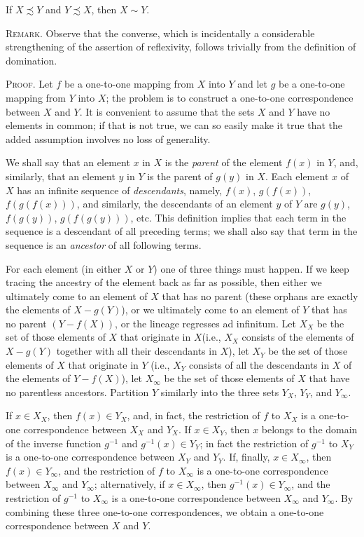 \begin{named} If $X \precsim Y$ and $Y \precsim X$, then $X \sim Y$.
\end{named}

\textsc{Remark}. Observe that the converse, which is incidentally a considerable strengthening of the assertion of reflexivity, follows trivially from the definition of domination. 

\textsc{Proof}. Let $f$ be a one-to-one mapping from $X$ into $Y$ and let $g$ be a one-to-one mapping from $Y$ into $X$; the problem is to construct a one-to-one correspondence between $X$ and $Y$. It is convenient to assume that the sets $X$ and $Y$ have no elements in common; if that is not true, we can so easily make it true that the added assumption  involves no loss of generality. 

We shall say that an element $x$ in $X$ is the \textit{parent} of the element $f(x)$ in $Y$, and, similarly, that an element $y$ in $Y$ is the parent of $g(y)$ in $X$. Each element $x$ of $X$ has an infinite sequence of \textit{descendants}, namely, $f(x)$, $g(f(x))$, $f(g(f(x)))$, and similarly, the descendants of an element $y$ of $Y$ are $g(y)$, $f(g(y))$, $g(f(g(y)))$, etc. This definition implies that each term in the sequence is a descendant of all preceding terms; we shall also say that term in the sequence is an \textit{ancestor} of all following terms. 

For each element (in either $X$ or $Y$) one of three things must happen. If we keep tracing the ancestry of the element back as far as possible, then either we ultimately come to an element of $X$ that has no parent (these orphans are exactly the elements of $X - g(Y)$), or we ultimately come to an element of $Y$ that has no parent $(Y - f(X))$, or the lineage regresses ad infinitum. Let $X_{X}$ be the set of those elements of $X$ that originate in $X$(i.e., $X_{X}$ consists of the elements of $X - g(Y)$ together with all their descendants in $X$), let $X_{Y}$ be the set of those elements of $X$ that originate in $Y$ (i.e., $X_{Y}$ consists of all the descendants in $X$ of the elements of $Y - f(X)$), let $X_{\infty}$ be the set of those elements of $X$ that have no parentless ancestors. Partition $Y$ similarly into the three sets $Y_{X}$, $Y_{Y}$, and $Y_{\infty}$. 

If $x \in X_{X}$, then $f(x) \in Y_{X}$, and, in fact, the restriction of $f$ to $X_{X}$ is a one-to-one correspondence between $X_{X}$ and $Y_{X}$. If $x \in X_{Y}$, then $x$ belongs to the domain of the inverse function $g^{-1}$ and $g^{-1}(x) \in Y_{Y}$; in fact the restriction of $g^{-1}$ to $X_{Y}$ is a one-to-one correspondence between $X_{Y}$ and $Y_{Y}$. If, finally, $x \in X_{\infty}$, then $f(x) \in Y_{\infty}$, and the restriction of $f$ to $X_{\infty}$ is a one-to-one correspondence between $X_{\infty}$ and  $Y_{\infty}$; alternatively, if $x \in X_{\infty}$, then $g^{-1}(x) \in Y_{\infty}$, and the restriction of $g^{-1}$ to $X_{\infty}$ is a one-to-one correspondence between $X_{\infty}$ and $Y_{\infty}$. By combining these three one-to-one correspondences, we obtain a one-to-one correspondence between $X$ and $Y$. 

